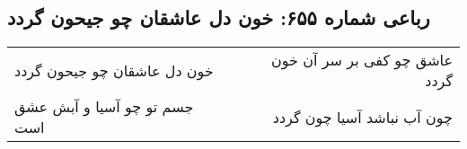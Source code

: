 \begin{center}
\section*{رباعی شماره ۶۵۵: خون دل عاشقان چو جیحون گردد}
\label{sec:0655}
\begin{longtable}{l p{0.5cm} r}
خون دل عاشقان چو جیحون گردد
&&
عاشق چو کفی بر سر آن خون گردد
\\
جسم تو چو آسیا و آبش عشق است
&&
چون آب نباشد آسیا چون گردد
\\
\end{longtable}
\end{center}
